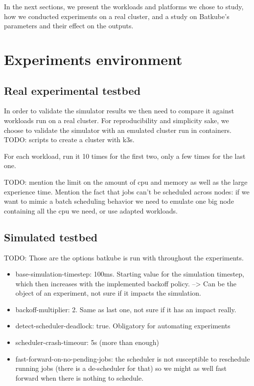 \documentclass[12pt, a4paper]{memoir}
\begin{document}
In the next sections, we present the workloads and platforms we chose to study,
how we conducted experiments on a real cluster, and a study on Batkube's
parameters and their effect on the outputs.

\section{Experiments environment}

\subsection{Real experimental testbed}

In order to validate the simulator results we then need to compare it against
workloads run on a real cluster. For reproducibility and simplicity sake, we
choose to validate the simulator with an emulated cluster run in
containers.\\

TODO: scripts to create a cluster with k3s. 

For each workload, run it 10 times for the first two, only a few times for the
last one.

TODO: mention the limit on the amount of cpu and memory as well as the large
experience time. Mention the fact that jobs can't be scheduled across nodes:
if we want to mimic a batch scheduling behavior we need to emulate one big node
containing all the cpu we need, or use adapted workloads.

\subsection{Simulated testbed}

TODO: Those are the options batkube is run with throughout the experiments.
\begin{itemize}
	\item base-simulation-timestep: 100ms. Starting value for the
		simulation timestep, which then increases with the implemented
		backoff policy. --> Can be the object of an experiment, not
		sure if it impacts the simulation.
	\item backoff-multiplier: 2. Same as last one, not sure if it has an impact really.
	\item detect-scheduler-deadlock: true. Obligatory for automating experiments
	\item scheduler-crash-timeour: 5s (more than enough)
	\item fast-forward-on-no-pending-jobs: the scheduler is not susceptible
		to reschedule running jobs (there is a de-scheduler for that)
		so we might as well fast forward when there is nothing to
		schedule.
\end{itemize}
\end{document}
